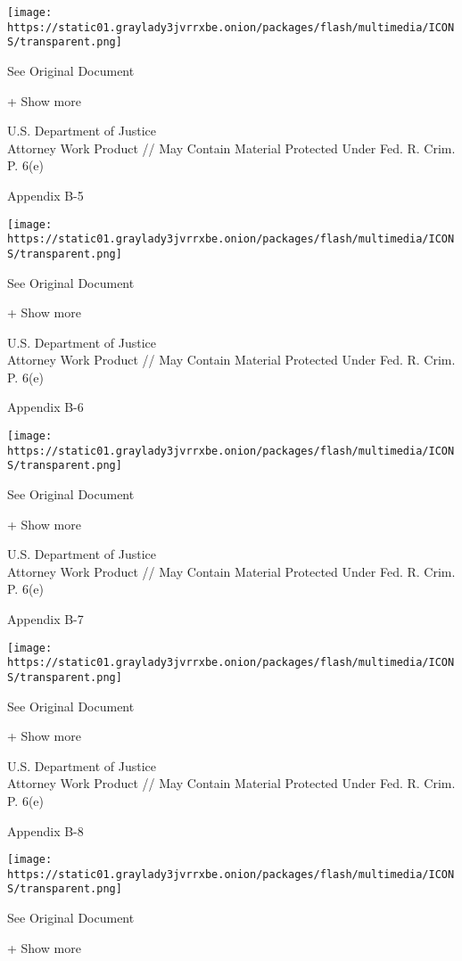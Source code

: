 \protect\hyperlink{}{}

\texttt{[image: https://static01.graylady3jvrrxbe.onion/packages/flash/multimedia/ICONS/transparent.png]}

See Original Document

+ Show more

U.S. Department of Justice\\
Attorney Work Product // May Contain Material Protected Under Fed. R.
Crim. P. 6(e)

Appendix B-5

\protect\hyperlink{}{}

\texttt{[image: https://static01.graylady3jvrrxbe.onion/packages/flash/multimedia/ICONS/transparent.png]}

See Original Document

+ Show more

U.S. Department of Justice\\
Attorney Work Product // May Contain Material Protected Under Fed. R.
Crim. P. 6(e)

Appendix B-6

\protect\hyperlink{}{}

\texttt{[image: https://static01.graylady3jvrrxbe.onion/packages/flash/multimedia/ICONS/transparent.png]}

See Original Document

+ Show more

U.S. Department of Justice\\
Attorney Work Product // May Contain Material Protected Under Fed. R.
Crim. P. 6(e)

Appendix B-7

\protect\hyperlink{}{}

\texttt{[image: https://static01.graylady3jvrrxbe.onion/packages/flash/multimedia/ICONS/transparent.png]}

See Original Document

+ Show more

U.S. Department of Justice\\
Attorney Work Product // May Contain Material Protected Under Fed. R.
Crim. P. 6(e)

Appendix B-8

\protect\hyperlink{}{}

\texttt{[image: https://static01.graylady3jvrrxbe.onion/packages/flash/multimedia/ICONS/transparent.png]}

See Original Document

+ Show more

